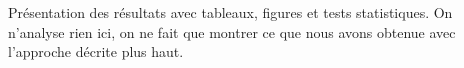 Présentation des résultats avec tableaux, figures et tests statistiques.
On n'analyse rien ici, on ne fait que montrer ce que nous avons obtenue avec l'approche décrite plus haut.